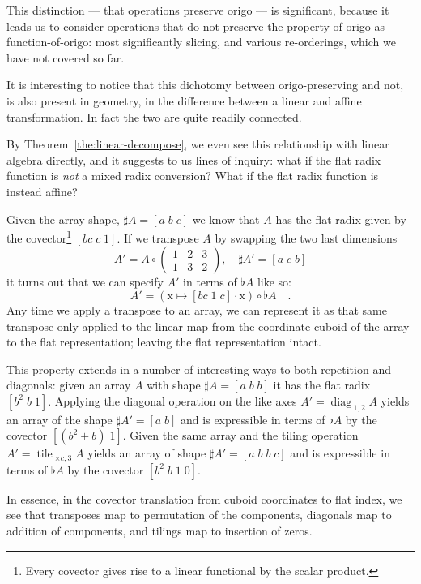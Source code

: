 \documentclass{DIKU-report-variant}
\newcommand\mrm[1]{\mathrm{#1}}
\newcommand\brm[1]{\bm{\mrm{#1}}}
\newcommand\diag{\operatorname*{\brm{diag}\,}}
\newcommand\tile{\operatorname*{\brm{tile}\,}}
\begin{document}
This distinction --- that operations preserve origo --- is significant, because it leads us to
consider operations that do not preserve the property of origo-as-function-of-origo: most significantly
slicing, and various re-orderings, which we have not covered so far.

It is interesting to notice that this dichotomy between origo-preserving and not, is also present
in geometry, in the difference between a linear and affine transformation. In fact the two
are quite readily connected.

By Theorem~\ref{the:linear-decompose}, we even see this relationship with linear algebra directly,
and it suggests to us lines of inquiry: what if the flat radix function is \emph{not} a mixed radix
conversion? What if the flat radix function is instead affine?

Given the array shape, \(\sharp A = [a\; b\; c]\) we know that \(A\) has the flat radix given
by the covector\footnote{Every covector gives rise to a linear functional by the scalar product.} \([bc\; c\; 1]\).
If we transpose \(A\) by swapping the two last dimensions
\[A' = A \circ \left(\begin{smallmatrix}1&2&3\\1&3&2\end{smallmatrix}\right),\quad \sharp A' = [a\; c\; b]\]
it turns out that we can specify \(A'\) in terms of \(\flat A\) like so:
\[A' = (\brm x \mapsto [bc\; 1\; c]\cdot\brm x) \circ \flat A\quad.\]
Any time we apply a transpose to an array, we can represent it as that same transpose only applied
to the linear map from the coordinate cuboid of the array to the flat representation; leaving the flat
representation intact.

This property extends in a number of interesting ways to both repetition and diagonals:
given an array \(A\) with shape \(\sharp A = [a\; b\; b]\) it has the flat radix \([b^2\;b\; 1]\).
Applying the diagonal operation on the like axes \(A' = \diag_{1,2} A\) yields an array of the shape
\(\sharp A' = [a\; b]\) and is expressible in terms of \(\flat A\) by the covector \([(b^2 + b)\; 1]\).
Given the same array and the tiling operation \(A' = \tile_{\times c, 3} A\) yields an array
of shape \(\sharp A' = [a\; b\; b\; c]\) and is expressible in terms of \(\flat A\) by the covector
\([b^2\; b\; 1\; 0]\).

In essence, in the covector translation from cuboid coordinates to flat index, we see that
transposes map to permutation of the components, diagonals map to addition of components,
and tilings map to insertion of zeros.
\end{document}

